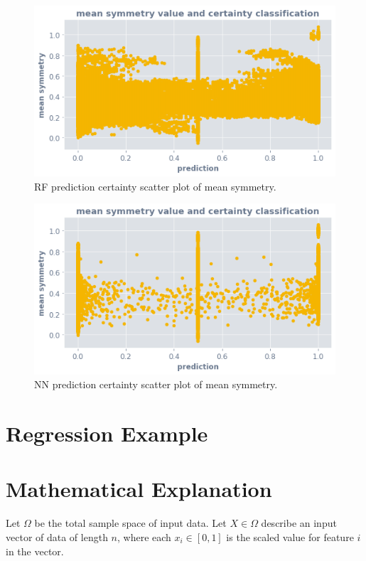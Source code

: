 \documentclass[a4paperpaper,twocolumn]{article}
\begin{document}
\begin{figure}
\centering
\includegraphics[width=\columnwidth]{img/rf_ocsvm_mean_symmetry.png}
\caption{RF prediction certainty scatter plot of mean symmetry.}
\label{fig:nn-ocsvm-mean-symmetry-scatter}
\end{figure}

\begin{figure}
\centering
\includegraphics[width=\columnwidth]{img/nn_ocsvm_mean_symmetry.png}
\caption{NN prediction certainty scatter plot of mean symmetry.}
\label{fig:nn-ocsvm-mean-symmetry-scatter}
\end{figure}

\section{Regression Example}


\section{Mathematical Explanation}

Let $\Omega$ be the total sample space of input data. Let $X \in \Omega$ describe an input vector of data of length $n$, where each $x_i \in [0, 1]$ is the scaled value for feature $i$ in the vector.
\end{document}
